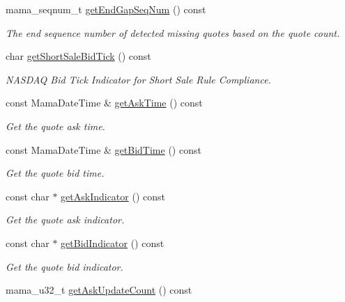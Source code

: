 \begin{CompactItemize}
mama\_\-seqnum\_\-t \hyperlink{classWombat_1_1MamdaQuoteListener_bc314f778476b46c392f6a775c3a9d61}{get\-End\-Gap\-Seq\-Num} () const 
\begin{CompactList}\small\item\em The end sequence number of detected missing quotes based on the quote count. \item\end{CompactList}\item 
char \hyperlink{classWombat_1_1MamdaQuoteListener_3f4102824e3e3d8a0032c0978067387f}{get\-Short\-Sale\-Bid\-Tick} () const 
\begin{CompactList}\small\item\em NASDAQ Bid Tick Indicator for Short Sale Rule Compliance. \item\end{CompactList}\item 
const Mama\-Date\-Time \& \hyperlink{classWombat_1_1MamdaQuoteListener_2b0b0dd373fe54f67149a708ee147e79}{get\-Ask\-Time} () const 
\begin{CompactList}\small\item\em Get the quote ask time. \item\end{CompactList}\item 
const Mama\-Date\-Time \& \hyperlink{classWombat_1_1MamdaQuoteListener_467043c393ad5906990c6c90c777e56b}{get\-Bid\-Time} () const 
\begin{CompactList}\small\item\em Get the quote bid time. \item\end{CompactList}\item 
const char $\ast$ \hyperlink{classWombat_1_1MamdaQuoteListener_fac643c6fb9ad15e2d443d6a03304dfe}{get\-Ask\-Indicator} () const 
\begin{CompactList}\small\item\em Get the quote ask indicator. \item\end{CompactList}\item 
const char $\ast$ \hyperlink{classWombat_1_1MamdaQuoteListener_2ac1e2dabc677e93e414cf0c1d1fa94f}{get\-Bid\-Indicator} () const 
\begin{CompactList}\small\item\em Get the quote bid indicator. \item\end{CompactList}\item 
mama\_\-u32\_\-t \hyperlink{classWombat_1_1MamdaQuoteListener_f1cf490659772cef488d7207b3587958}{get\-Ask\-Update\-Count} () const 

\end{CompactItemize}
